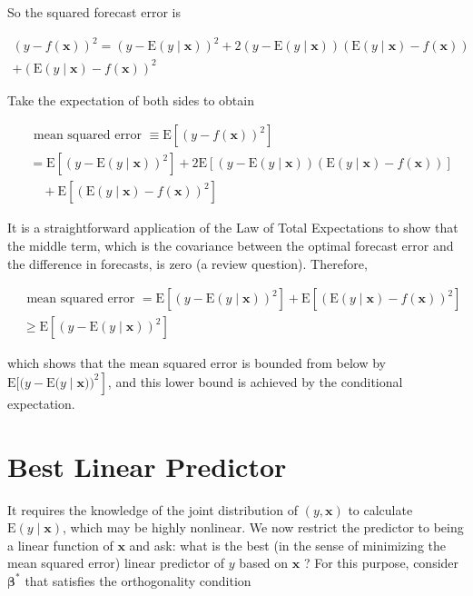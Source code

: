 \documentclass[10pt]{article}
\begin{document}
So the squared forecast error is


\begin{gather*}
(y-f(\mathbf{x}))^{2}=(y-\mathrm{E}(y \mid \mathbf{x}))^{2}+2(y-\mathrm{E}(y \mid \mathbf{x}))(\mathrm{E}(y \mid \mathbf{x})-f(\mathbf{x})) \\
+(\mathrm{E}(y \mid \mathbf{x})-f(\mathbf{x}))^{2} \tag{2.9.2}
\end{gather*}


Take the expectation of both sides to obtain


\begin{align*}
& \text { mean squared error } \equiv \mathrm{E}\left[(y-f(\mathbf{x}))^{2}\right] \\
& =\mathrm{E}\left[(y-\mathrm{E}(y \mid \mathbf{x}))^{2}\right]+2 \mathrm{E}[(y-\mathrm{E}(y \mid \mathbf{x}))(\mathrm{E}(y \mid \mathbf{x})-f(\mathbf{x}))] \\
& \quad+\mathrm{E}\left[(\mathrm{E}(y \mid \mathbf{x})-f(\mathbf{x}))^{2}\right] \tag{2.9.3}
\end{align*}


It is a straightforward application of the Law of Total Expectations to show that the middle term, which is the covariance between the optimal forecast error and the difference in forecasts, is zero (a review question). Therefore,


\begin{align*}
& \text { mean squared error }=\mathrm{E}\left[(y-\mathrm{E}(y \mid \mathbf{x}))^{2}\right]+\mathrm{E}\left[(\mathrm{E}(y \mid \mathbf{x})-f(\mathbf{x}))^{2}\right] \\
& \geq \mathrm{E}\left[(y-\mathrm{E}(y \mid \mathbf{x}))^{2}\right] \tag{2.9.4}
\end{align*}


which shows that the mean squared error is bounded from below by $\mathrm{E}[(y-\mathrm{E}(y \mid \left.\mathbf{x} \boldsymbol{)})^{2}\right]$, and this lower bound is achieved by the conditional expectation.

\section*{Best Linear Predictor}
It requires the knowledge of the joint distribution of $(y, \mathbf{x})$ to calculate $\mathrm{E}(y \mid \mathbf{x})$, which may be highly nonlinear. We now restrict the predictor to being a linear function of $\mathbf{x}$ and ask: what is the best (in the sense of minimizing the mean squared error) linear predictor of $y$ based on $\mathbf{x}$ ? For this purpose, consider $\boldsymbol{\beta}^{*}$ that satisfies the orthogonality condition
\end{document}
